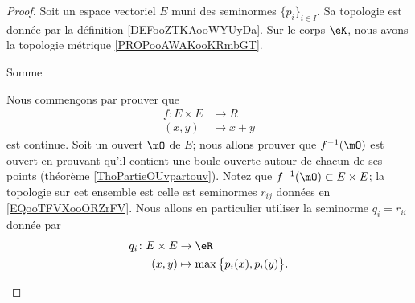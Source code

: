 \begin{proof}
	Soit un espace vectoriel \( E\) muni des seminormes \( \{ p_i \}_{i\in I}\). Sa topologie est donnée par la définition \ref{DEFooZTKAooWYUyDa}. Sur le corps \( \eK\), nous avons la topologie métrique \ref{PROPooAWAKooKRmbGT}.
	\begin{subproof}
		\item[Somme]

		Nous commençons par prouver que
		\begin{equation}
			\begin{aligned}
				f\colon E\times E & \to R       \\
				(x,y)             & \mapsto x+y
			\end{aligned}
		\end{equation}
		est continue. Soit un ouvert \( \mO\) de \( E\); nous allons prouver que \( f^{-1}(\mO)\) est ouvert en prouvant qu'il contient une boule ouverte autour de chacun de ses points (théorème \ref{ThoPartieOUvpartouv}). Notez que \( f^{-1}(\mO)\subset E\times E\); la topologie sur cet ensemble est celle est seminormes \( r_{ij}\) données en \eqref{EQooTFVXooORZrFV}. Nous allons en particulier utiliser la seminorme \( q_i=r_{ii}\) donnée par
		\begin{equation}        \label{EQooPDRPooZMDeoY}
			\begin{aligned}
				q_i\colon E\times E & \to \eR                                   \\
				(x,y)               & \mapsto \max\big\{ p_i(x),p_i(y)  \big\}.
			\end{aligned}
		\end{equation}


\end{subproof}
\end{proof}
